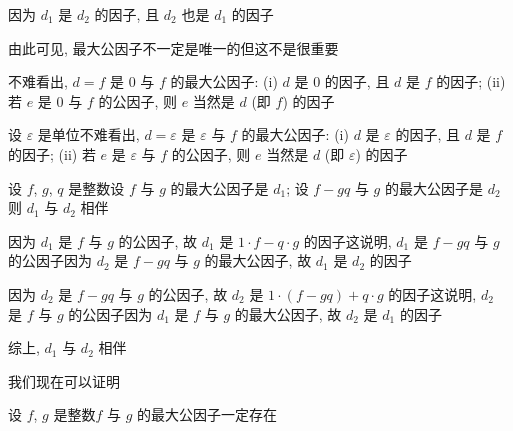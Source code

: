 \begin{pf}
    因为 $d_1$ 是 $d_2$ 的因子, 且 $d_2$ 也是 $d_1$ 的因子\period
\end{pf}

\begin{remark}
    由此可见, 最大公因子不一定是唯一的\period 但这不是很重要\period
\end{remark}

\begin{example}
    不难看出, $d = f$ 是 $0$ 与 $f$ 的最大公因子: (i) $d$ 是 $0$ 的因子, 且 $d$ 是 $f$ 的因子; (ii) 若 $e$ 是 $0$ 与 $f$ 的公因子, 则 $e$ 当然是 $d$ (即 $f$) 的因子\period
\end{example}

\begin{example}
    设 $\varepsilon$ 是单位\period 不难看出, $d = \varepsilon$ 是 $\varepsilon$ 与 $f$ 的最大公因子: (i) $d$ 是 $\varepsilon$ 的因子, 且 $d$ 是 $f$ 的因子; (ii) 若 $e$ 是 $\varepsilon$ 与 $f$ 的公因子, 则 $e$ 当然是 $d$ (即 $\varepsilon$) 的因子\period
\end{example}

\begin{proposition}
    设 $f$, $g$, $q$ 是整数\period 设 $f$ 与 $g$ 的最大公因子是 $d_1$; 设 $f - gq$ 与 $g$ 的最大公因子是 $d_2$\period 则 $d_1$ 与 $d_2$ 相伴\period
\end{proposition}

\begin{pf}
    因为 $d_1$ 是 $f$ 与 $g$ 的公因子, 故 $d_1$ 是 $1 \cdot f - q \cdot g$ 的因子\period 这说明, $d_1$ 是 $f - gq$ 与 $g$ 的公因子\period 因为 $d_2$ 是 $f - gq$ 与 $g$ 的最大公因子, 故 $d_1$ 是 $d_2$ 的因子\period

    因为 $d_2$ 是 $f - gq$ 与 $g$ 的公因子, 故 $d_2$ 是 $1 \cdot (f - gq) + q \cdot g$ 的因子\period 这说明, $d_2$ 是 $f$ 与 $g$ 的公因子\period 因为 $d_1$ 是 $f$ 与 $g$ 的最大公因子, 故 $d_2$ 是 $d_1$ 的因子\period

    综上, $d_1$ 与 $d_2$ 相伴\period
\end{pf}

我们现在可以证明
\begin{proposition}
    设 $f$, $g$ 是整数\period $f$ 与 $g$ 的最大公因子一定存在\period
\end{proposition}

